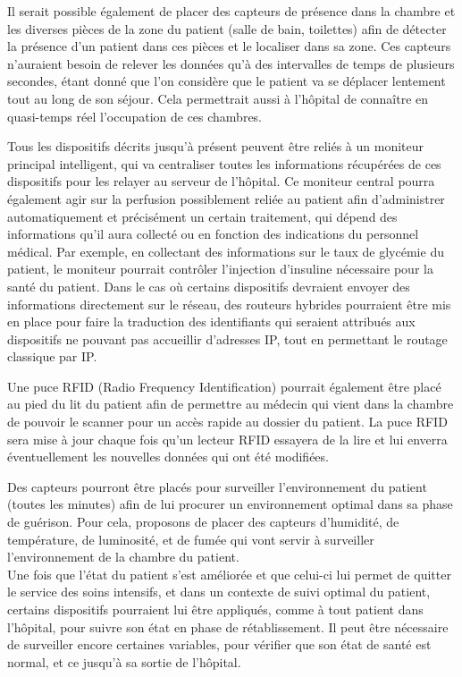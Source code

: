 \documentclass{article}
\begin{document}
Il serait possible également de placer des capteurs de présence dans la chambre et les diverses pièces de la zone du patient (salle de bain, toilettes) afin de détecter la présence d’un patient dans ces pièces et le localiser dans sa zone. Ces capteurs n’auraient besoin de relever les données qu'à des intervalles de temps de plusieurs secondes, étant donné que l’on considère que le patient va se déplacer lentement tout au long de son séjour. Cela permettrait aussi à l’hôpital de connaître en quasi-temps réel l’occupation de ces chambres.

Tous les dispositifs décrits jusqu’à présent peuvent être reliés à un moniteur principal intelligent, qui va centraliser toutes les informations récupérées de ces dispositifs pour les relayer au serveur de l’hôpital. Ce moniteur central pourra également agir sur la perfusion possiblement reliée au patient afin d’administrer automatiquement et précisément un certain traitement, qui dépend des informations qu'il aura collecté ou en fonction des indications du personnel médical. Par exemple, en collectant des informations sur le taux de glycémie du patient, le moniteur pourrait contrôler l’injection d’insuline nécessaire pour la santé du patient. Dans le cas où certains dispositifs devraient envoyer des informations directement sur le réseau, des routeurs hybrides pourraient être mis en place pour faire la traduction des identifiants qui seraient attribués aux dispositifs ne pouvant pas accueillir d'adresses IP, tout en permettant le routage classique par IP.

Une puce RFID (Radio Frequency Identification) \cite{RFID} pourrait également être placé au pied du lit du patient  afin de permettre au médecin qui vient dans la chambre de pouvoir le scanner pour un accès rapide au dossier du patient. La puce RFID sera mise à jour chaque fois qu'un lecteur RFID essayera de la lire et lui enverra éventuellement les nouvelles données qui ont été modifiées.

Des capteurs pourront être placés pour surveiller l’environnement du patient (toutes les minutes) afin de lui procurer un environnement optimal dans sa phase de guérison. Pour cela, proposons de placer des capteurs d’humidité, de température, de luminosité, \cite{HTL} et de fumée qui vont servir à surveiller l'environnement de la chambre du patient. 
\\

Une fois que l'état du patient s'est améliorée et que celui-ci lui permet de quitter le service des soins intensifs, et dans un contexte de suivi optimal du patient, certains dispositifs pourraient lui être appliqués, comme à tout patient dans l'hôpital, pour suivre son état en phase de rétablissement. Il peut être nécessaire de surveiller encore certaines variables, pour vérifier que son état de santé est normal, et ce jusqu’à sa sortie de l’hôpital. 
\end{document}
